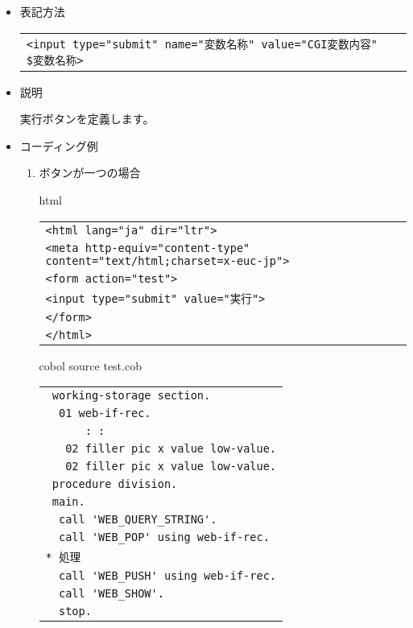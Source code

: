 \begin{itemize}

\item{表記方法}

\begin{tabular}{l}
\verb+<input type="submit" name="変数名称" value="CGI変数内容" $変数名称>+\\
\end{tabular}

\item{説明}

実行ボタンを定義します。

\item{コーディング例}

 \begin{enumerate}
 \item{ボタンが一つの場合}

   {\gt html}

   \begin{tabular}{|l|}
   \hline
   \verb+<html lang="ja" dir="ltr">+\\
   \verb+<meta http-equiv="content-type" content="text/html;charset=x-euc-jp">+\\
   \verb+<form action="test">+\\
   \verb+<input type="submit" value="実行">+\\
   \verb+</form>+\\
   \verb+</html>+\\
   \hline
   \end{tabular}

   {\gt cobol} source test.cob

   \begin{tabular}{|l|}
   \hline
   \verb+ working-storage section.+\\
   \verb+  01 web-if-rec.+\\
   \verb+      : : +\\
   \verb+   02 filler pic x value low-value.+\\
   \verb+   02 filler pic x value low-value.+\\
   \verb+ procedure division.+\\
   \verb+ main.+\\
   \verb+  call 'WEB_QUERY_STRING'.+\\
   \verb+  call 'WEB_POP' using web-if-rec.+\\
   \verb+* 処理+\\
   \verb+  call 'WEB_PUSH' using web-if-rec.+\\
   \verb+  call 'WEB_SHOW'.+\\
   \verb+  stop.+\\
   \hline
   \end{tabular}


\end{enumerate}
\end{itemize}
